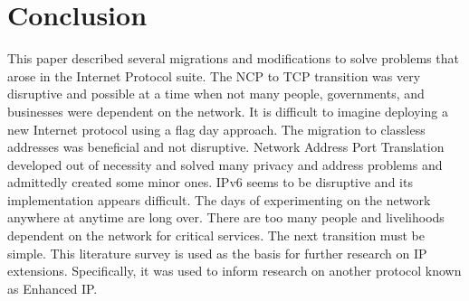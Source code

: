 \section{Conclusion}
This paper described several migrations and modifications to solve
problems that arose in the Internet Protocol suite.  The NCP to TCP
transition was very disruptive and possible at a time when not many
people, governments, and businesses were dependent on the network.
It is difficult to imagine deploying a new Internet protocol using a flag 
day approach.  The migration to classless addresses
was beneficial and not disruptive.  Network Address Port Translation
developed out of necessity and solved many privacy and address
problems and admittedly created some minor ones.  IPv6 seems to
be disruptive and its implementation appears difficult.  The days of
experimenting on the network anywhere at anytime are long over.  There are
too many people and livelihoods dependent on the network for critical
services.  The next transition must be simple.  This literature survey is used as the basis 
for further research on IP extensions.  Specifically, it was used to 
inform research on another protocol known as Enhanced IP.

